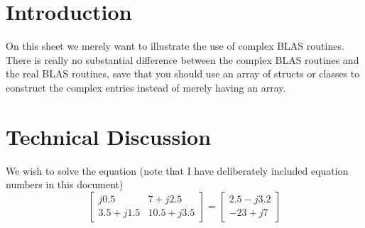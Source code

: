 \documentclass{article}
\begin{document}
\section{Introduction}
On this sheet we merely want to illustrate the use of complex BLAS routines.  There is really no substantial difference between the complex BLAS routines and the real BLAS routines, save that you should use an array of structs or classes to construct the complex entries instead of merely having an array.  
\section{Technical Discussion}
We wish to solve the equation (note that I have deliberately included equation numbers in this document)
\begin{equation}
\begin{bmatrix}
j0.5 & 7+j2.5\\3.5+j1.5&10.5+j3.5
\end{bmatrix}
=\begin{bmatrix}
2.5-j3.2\\-23+j7
\end{bmatrix}
\end{equation}
\end{document}
